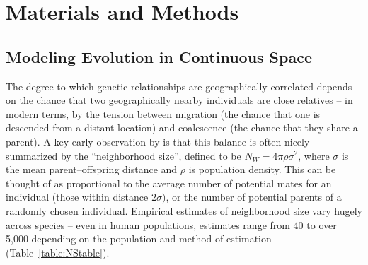 \documentclass[10pt,twoside,lineno,hidelinks]{preprint}
\begin{document}
\section{Materials and Methods}
\label{sec:materials:methods}

\subsection{Modeling Evolution in Continuous Space}

The degree to which genetic relationships are geographically correlated
depends on the chance that two geographically nearby individuals are close relatives
-- in modern terms, by the tension between
migration (the chance that one is descended from a distant location)
and coalescence (the chance that they share a parent).
A key early observation by \citet{Wright1946} is that this balance is often nicely summarized by the ``neighborhood size'',
defined to be $N_W = 4 \pi \rho \sigma^2$, where $\sigma$ is the mean parent--offspring distance and $\rho$ is population density. 
This can be thought of as proportional to the average number of potential mates for an individual (those within distance $2 \sigma)$,
or the number of potential parents of a randomly chosen individual. Empirical estimates of neighborhood size vary hugely across species
-- even in human populations,
estimates range from 40 to over 5,000 depending on the population and method of estimation (Table~\ref{table:NStable}).
\end{document}
